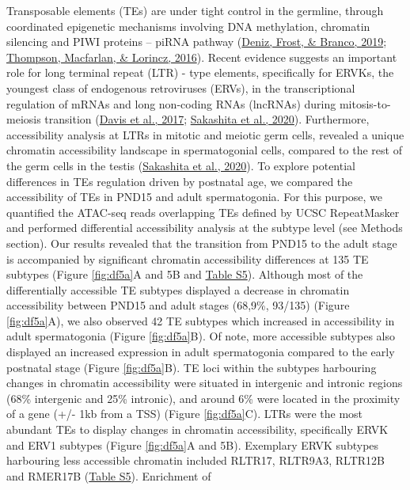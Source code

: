 \documentclass[12pt,twoside]{reedthesis}
\begin{document}
Transposable elements (TEs) are under tight control in the germline,
through coordinated epigenetic mechanisms involving DNA methylation,
chromatin silencing and PIWI proteins -- piRNA pathway (\protect\hyperlink{ref-deniz2019}{Deniz, Frost, \& Branco, 2019}; \protect\hyperlink{ref-thompson2016}{Thompson, Macfarlan, \& Lorincz, 2016}). Recent evidence suggests an important role for long
terminal repeat (LTR) - type elements, specifically for ERVKs, the
youngest class of endogenous retroviruses (ERVs), in the transcriptional
regulation of mRNAs and long non-coding RNAs (lncRNAs) during
mitosis-to-meiosis transition (\protect\hyperlink{ref-davis2017}{Davis et al., 2017}; \protect\hyperlink{ref-sakashita2020}{Sakashita et al., 2020}). Furthermore,
accessibility analysis at LTRs in mitotic and meiotic germ cells,
revealed a unique chromatin accessibility landscape in spermatogonial
cells, compared to the rest of the germ cells in the testis
(\protect\hyperlink{ref-sakashita2020}{Sakashita et al., 2020}). To explore potential differences in TEs regulation
driven by postnatal age, we compared the accessibility of TEs in PND15
and adult spermatogonia. For this purpose, we quantified the ATAC-seq
reads overlapping TEs defined by UCSC RepeatMasker and performed
differential accessibility analysis at the subtype level (see Methods
section). Our results revealed that the transition from PND15 to the
adult stage is accompanied by significant chromatin accessibility
differences at 135 TE subtypes (Figure \ref{fig:df5a}A and 5B and \protect\hyperlink{st}{Table S5}). Although
most of the differentially accessible TE subtypes displayed a decrease
in chromatin accessibility between PND15 and adult stages (68,9\%,
93/135) (Figure \ref{fig:df5a}A), we also observed 42 TE subtypes which increased in
accessibility in adult spermatogonia (Figure \ref{fig:df5a}B). Of note, more accessible
subtypes also displayed an increased expression in adult spermatogonia
compared to the early postnatal stage (Figure \ref{fig:df5a}B). TE loci within the
subtypes harbouring changes in chromatin accessibility were situated in
intergenic and intronic regions (68\% intergenic and 25\% intronic), and
around 6\% were located in the proximity of a gene (+/- 1kb from a TSS)
(Figure \ref{fig:df5a}C). LTRs were the most abundant TEs to display changes in
chromatin accessibility, specifically ERVK and ERV1 subtypes (Figure \ref{fig:df5a}A
and 5B). Exemplary ERVK subtypes harbouring less accessible chromatin
included RLTR17, RLTR9A3, RLTR12B and RMER17B (\protect\hyperlink{st}{Table S5}). Enrichment of
\end{document}
